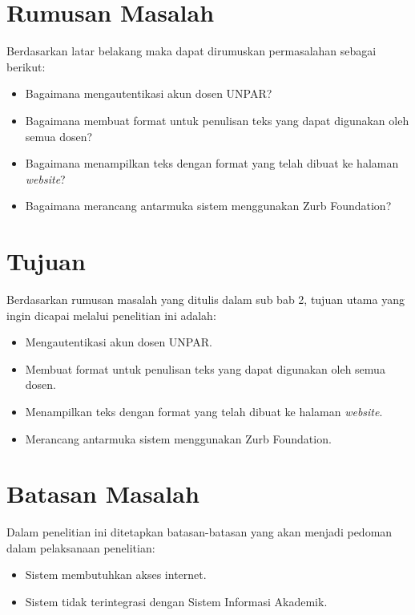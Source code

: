 \section{Rumusan Masalah}
Berdasarkan latar belakang maka dapat dirumuskan permasalahan sebagai berikut:
\begin{itemize}
	\item Bagaimana mengautentikasi akun dosen UNPAR?
	\item Bagaimana membuat format untuk penulisan teks yang dapat digunakan oleh semua dosen?
	\item Bagaimana menampilkan teks dengan format yang telah dibuat ke halaman {\it website}?
	\item Bagaimana merancang antarmuka sistem menggunakan Zurb Foundation?
\end{itemize}

\section{Tujuan}
Berdasarkan rumusan masalah yang ditulis dalam sub bab 2, tujuan utama yang
ingin dicapai melalui penelitian ini adalah:
\begin{itemize}
	\item Mengautentikasi akun dosen UNPAR.
	\item Membuat format untuk penulisan teks yang dapat digunakan oleh semua dosen.
	\item Menampilkan teks dengan format yang telah dibuat ke halaman {\it website}.
	\item Merancang antarmuka sistem menggunakan Zurb Foundation.
\end{itemize}

\section{Batasan Masalah}
Dalam penelitian ini ditetapkan batasan-batasan yang akan menjadi pedoman dalam
pelaksanaan penelitian:
\begin{itemize}
    \item Sistem membutuhkan akses internet.
	\item Sistem tidak terintegrasi dengan Sistem Informasi Akademik.
\end{itemize}

